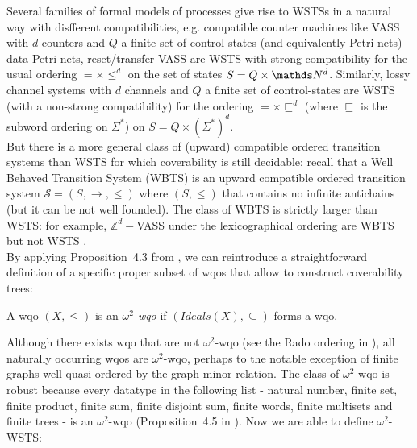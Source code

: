 \documentclass[runningheads]{llncs}
\begin{document}
Several families of formal models of processes  \cite{DBLP:journals/tcs/FinkelS01} give rise to WSTSs in a natural way with disfferent compatibilities, e.g. compatible counter machines like VASS with $d$ counters and $Q$ a finite set of control-states (and equivalently Petri nets) data Petri nets, reset/transfer VASS are WSTS with strong compatibility for the usual ordering $=\times \leq^d$ on the set of states $S=Q \times \N^d$.
Similarly, lossy channel systems with $d$ channels and $Q$ a finite set of control-states are WSTS (with a non-strong compatibility)
for the ordering $=\times \sqsubseteq^d$ (where $\sqsubseteq$ is the subword ordering on $\Sigma^*$) on $S= Q \times (\Sigma^*)^d$.\\

But there is a more general class of (upward) compatible ordered transition systems than WSTS for which coverability is still decidable: recall that a Well Behaved Transition System (WBTS) \cite{DBLP:journals/lmcs/BlondinFM17} is an upward compatible ordered transition system $\mathscr{S}=(S, \rightarrow, \leq)$ where $(S,\leq)$ that contains no infinite antichains (but it can be not well founded). The class of WBTS is strictly larger than WSTS: for example, $\mathbb{Z}^d-$VASS under the lexicographical ordering are WBTS but not WSTS \cite{DBLP:journals/lmcs/BlondinFM17}. \\

By applying Proposition~4.3 from \cite{DBLP:journals/corr/abs-1208-4549}, we can reintroduce a straightforward definition of a specific proper subset of wqos that allow to construct coverability trees: 

\begin{definition}
A wqo $(X, \leq)$ is an \emph{$\omega^2$-wqo} if $(Ideals(X), \subseteq)$ forms a wqo.
\end{definition}


Although there exists wqo that are not $\omega^2$-wqo (see the Rado ordering in \cite{DBLP:journals/ipl/Jancar99}), all naturally occurring wqos are $\omega^2$-wqo, perhaps to the notable exception of ﬁnite graphs well-quasi-ordered by the graph minor relation. %
The class of $\omega^2$-wqo is robust because every datatype in the following list - natural number, finite set, ﬁnite product, ﬁnite sum, finite disjoint sum, ﬁnite words, ﬁnite multisets and ﬁnite trees - is an $\omega^2$-wqo (Proposition~4.5 in \cite{DBLP:journals/corr/abs-1208-4549}). Now we are able to define $\omega^2$-WSTS:
\end{document}
